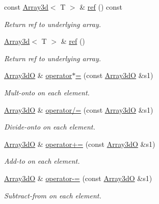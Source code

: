 \begin{DoxyCompactItemize}
const \mbox{\hyperlink{classXMLArray_1_1Array3d}{Array3d}}$<$ T $>$ \& \mbox{\hyperlink{classADAT_1_1Array3dO_a7ad48358af907cbaf3cf50fad298a088}{ref}} () const
\begin{DoxyCompactList}\small\item\em Return ref to underlying array. \end{DoxyCompactList}\item 
\mbox{\hyperlink{classXMLArray_1_1Array3d}{Array3d}}$<$ T $>$ \& \mbox{\hyperlink{classADAT_1_1Array3dO_ad56a8ea2aac56eba9b8b74af06e79970}{ref}} ()
\begin{DoxyCompactList}\small\item\em Return ref to underlying array. \end{DoxyCompactList}\item 
\mbox{\hyperlink{classADAT_1_1Array3dO}{Array3dO}} \& \mbox{\hyperlink{classADAT_1_1Array3dO_a739c7272b271536ac15a00b5da43b6d6}{operator$\ast$=}} (const \mbox{\hyperlink{classADAT_1_1Array3dO}{Array3dO}} \&s1)
\begin{DoxyCompactList}\small\item\em Mult-\/onto on each element. \end{DoxyCompactList}\item 
\mbox{\hyperlink{classADAT_1_1Array3dO}{Array3dO}} \& \mbox{\hyperlink{classADAT_1_1Array3dO_a634dcf5154efc0a7496d50f4f258978d}{operator/=}} (const \mbox{\hyperlink{classADAT_1_1Array3dO}{Array3dO}} \&s1)
\begin{DoxyCompactList}\small\item\em Divide-\/onto on each element. \end{DoxyCompactList}\item 
\mbox{\hyperlink{classADAT_1_1Array3dO}{Array3dO}} \& \mbox{\hyperlink{classADAT_1_1Array3dO_a5d72c8e7dd54897fe898b07616123229}{operator+=}} (const \mbox{\hyperlink{classADAT_1_1Array3dO}{Array3dO}} \&s1)
\begin{DoxyCompactList}\small\item\em Add-\/to on each element. \end{DoxyCompactList}\item 
\mbox{\hyperlink{classADAT_1_1Array3dO}{Array3dO}} \& \mbox{\hyperlink{classADAT_1_1Array3dO_a5c840f5014264fdee101194d22f237e0}{operator-\/=}} (const \mbox{\hyperlink{classADAT_1_1Array3dO}{Array3dO}} \&s1)
\begin{DoxyCompactList}\small\item\em Subtract-\/from on each element. \end{DoxyCompactList}\item 

\end{DoxyCompactItemize}
